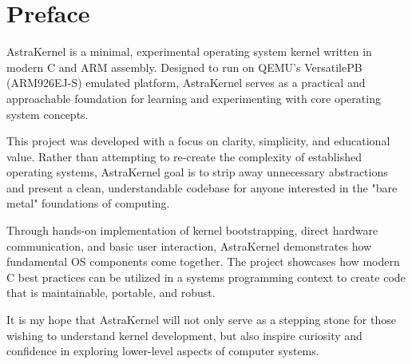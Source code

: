 \doublespacing
\newpage
{}
\section*{Preface}

AstraKernel is a minimal, experimental operating system kernel written in modern 
C and ARM assembly. Designed to run on QEMU’s VersatilePB (ARM926EJ-S) emulated 
platform, AstraKernel serves as a practical and approachable foundation for 
learning and experimenting with core operating system concepts.

This project was developed with a focus on clarity, simplicity, and educational 
value. Rather than attempting to re-create the complexity of established operating 
systems, AstraKernel goal is to strip away unnecessary abstractions and present a 
clean, understandable codebase for anyone interested in the "bare metal" 
foundations of computing.

Through hands-on implementation of kernel bootstrapping, direct hardware 
communication, and basic user interaction, AstraKernel demonstrates how 
fundamental OS components come together. The project showcases how modern C 
best practices can be utilized in a systems programming context to create 
code that is maintainable, portable, and robust.

It is my hope that AstraKernel will not only serve as a stepping stone 
for those wishing to understand kernel development, but also inspire curiosity 
and confidence in exploring lower-level aspects of computer systems.

